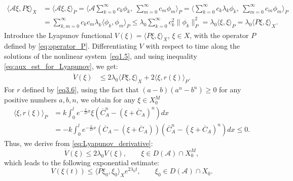 \documentclass{mpi2015-cscpreprint}
\numberwithin{equation}{section}
\begin{document}
\begin{equation}\label{eq:aux_est_for_Lyapunov}
\begin{aligned}
\langle \mathcal{A}\xi, P\xi\rangle_{X}
&= \langle \mathcal{A}\xi, \xi\rangle_P 
=\biggr\langle \mathcal{A}\sum_{k=0}^\infty c_k\phi_k,\ \sum_{m=0}^\infty c_m\phi_m\biggr\rangle_P 
= \biggr\langle \sum_{k=0}^\infty c_k\lambda_k\phi_k,\ \sum_{m=0}^\infty c_m\phi_m\biggr\rangle_P
\\&= \sum_{k,m=0}^\infty c_k c_m \lambda_k \langle\phi_k,\phi_m\rangle_P 
\leq \lambda_0\sum_{k=0}^{\infty} c_k^2\|\phi_k\|_P^2 
=\lambda_0\langle\xi,\xi\rangle_P = \lambda_0\langle P\xi,\xi\rangle_{X}.
\end{aligned}
\end{equation}
Introduce the Lyapunov functional $V(\xi)=\langle P\xi,\xi\rangle_{X}$, $\xi\in X$, with the operator $P$ defined by \eqref{eq:operator_P}. Differentiating $V$ with respect to time along the solutions of the nonlinear system~\eqref{eq1.5}, and using inequality \eqref{eq:aux_est_for_Lyapunov}, we get:
\begin{equation}\label{eq:Lyapunov_derivative}
\begin{aligned}
\dot{V}(\xi)&
\leq 2\lambda_0\langle P\xi,\xi\rangle_{X}+2\langle\xi,r(\xi)\rangle_P.
\end{aligned}
\end{equation}
For $r$ defined by \eqref{eq3.6}, using the fact that $(a-b)(a^n-b^n)\ge0$ for any positive numbers $a,b,n$, we obtain for any $\xi\in X_0^M$
\begin{equation*}
\begin{aligned}
\langle\xi,r(\xi)\rangle_P&=k\int_0^l e^{-\frac{v}{D}x}\xi\left(\overline{C}_A^n- (\xi+\overline{C}_A)^n\right)dx
\\&=-k\int_0^le^{-\frac{v}{D}x}\left(\overline{C}_A- (\xi+\overline{C}_A)\right)\left(\overline{C}_A^n- (\xi+\overline{C}_A)^n\right)dx\le0.
\end{aligned}
\end{equation*}
Thus, we derive from \eqref{eq:Lyapunov_derivative}: 
\begin{equation*}
\dot{V}(\xi)\le 2\lambda_0 V(\xi),
\qquad \xi\in D(\mathcal{A})\cap X_0^M,
\end{equation*}
which leads to the following exponential estimate:
\begin{equation*}
V(\xi(t))\le \langle P\xi_0,\xi_0\rangle_{X} e^{2\lambda_0 t},
\qquad \xi_0\in D(\mathcal{A})\cap X_0.
\end{equation*}
\end{document}
